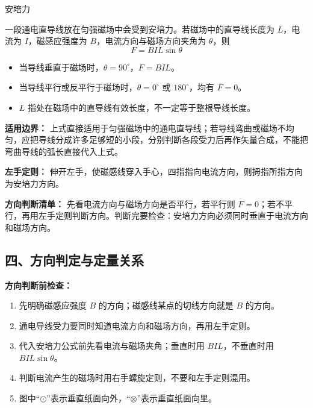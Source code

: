 \begin{conceptbox}{安培力}

一段通电直导线放在匀强磁场中会受到安培力。若磁场中的直导线长度为 $L$，电流为 $I$，磁感应强度为 $B$，电流方向与磁场方向夹角为 $\theta$，则
\[
\boxed{F = BIL\sin\theta}
\]

\begin{itemize}
  \item 当导线垂直于磁场时，$\theta = 90^\circ$，$F = BIL$。
  \item 当导线平行或反平行于磁场时，$\theta = 0^\circ$ 或 $180^\circ$，均有 $F = 0$。
  \item $L$ 指处在磁场中的直导线有效长度，不一定等于整根导线长度。
\end{itemize}

\textbf{适用边界：} 上式直接适用于匀强磁场中的通电直导线；若导线弯曲或磁场不均匀，应把导线分成许多足够短的小段，分别判断各段受力后再作矢量合成，不能把弯曲导线的弧长直接代入上式。

\begin{center}


\label{fig:ampere-force-angle}
\end{center}

\textbf{左手定则：} 伸开左手，使磁感线穿入手心，四指指向电流方向，则拇指所指方向为安培力方向。

\begin{center}


\label{fig:left-hand-rule}
\end{center}

\textbf{方向判断清单：} 先看电流方向与磁场方向是否平行，若平行则 $F=0$；若不平行，再用左手定则判断方向。判断完要检查：安培力方向必须同时垂直于电流方向和磁场方向。

\end{conceptbox}

\begin{samepage}
\section*{四、方向判定与定量关系}

\textbf{方向判断前检查：}
\nopagebreak[4]
\begin{enumerate}
  \item 先明确磁感应强度 $B$ 的方向；磁感线某点的切线方向就是 $B$ 的方向。
  \item 通电导线受力要同时知道电流方向和磁场方向，再用左手定则。
  \item 代入安培力公式前先看电流与磁场夹角；垂直时用 $BIL$，不垂直时用 $BIL\sin\theta$。
  \item 判断电流产生的磁场时用右手螺旋定则，不要和左手定则混用。
  \item 图中“$\odot$”表示垂直纸面向外，“$\otimes$”表示垂直纸面向里。
\end{enumerate}
\end{samepage}

